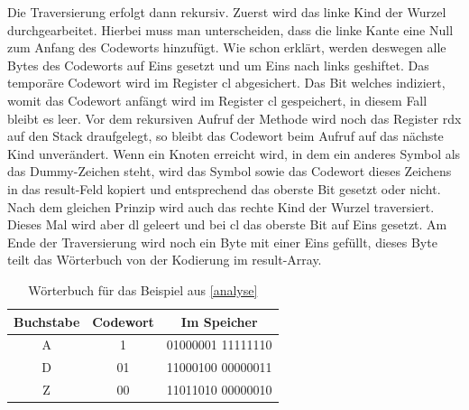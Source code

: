 \documentclass[course=erap]{aspdoc}
\begin{document}
Die Traversierung erfolgt dann rekursiv. Zuerst wird das linke Kind der Wurzel durchgearbeitet. Hierbei muss man unterscheiden, dass die linke Kante eine Null zum Anfang des Codeworts hinzufügt. Wie schon erklärt, werden deswegen alle Bytes des Codeworts auf Eins gesetzt und um Eins nach links geshiftet. Das temporäre Codewort wird im Register cl abgesichert. Das Bit welches indiziert, womit das Codewort anfängt wird im Register cl gespeichert, in diesem Fall bleibt es leer. Vor dem rekursiven Aufruf der Methode wird noch das Register rdx auf den Stack draufgelegt, so bleibt das Codewort beim Aufruf auf das nächste Kind unverändert. Wenn ein Knoten erreicht wird, in dem ein anderes Symbol als das Dummy-Zeichen steht, wird das Symbol sowie das Codewort dieses Zeichens in das result-Feld kopiert und entsprechend das oberste Bit gesetzt oder nicht. Nach dem gleichen Prinzip wird auch das rechte Kind der Wurzel traversiert. Dieses Mal wird aber dl geleert und bei cl das oberste Bit auf Eins gesetzt. Am Ende der Traversierung wird noch ein Byte mit einer Eins gefüllt, dieses Byte teilt das Wörterbuch von der Kodierung im result-Array.\\

\begin{table}[h]
\centering
\begin{tabular}{ | c | c | c | }
\hline
 Buchstabe & Codewort & Im Speicher\\
\hline
 A & 1 & 01000001 11111110\\
\hline
 D & 01 & 11000100 00000011\\
\hline
 Z & 00 & 11011010 00000010\\
\hline
\end{tabular}
\caption{Wörterbuch für das Beispiel aus \ref{analyse}}
\end{table}
\end{document}
